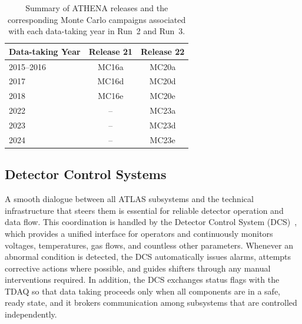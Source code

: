 \begin{table}[htbp]
    \centering
    \small
    \renewcommand{\arraystretch}{1.3} %
    \setlength{\tabcolsep}{12pt}      %
    \caption{Summary of ATHENA releases and the corresponding Monte Carlo campaigns associated with each data-taking year in Run~2 and Run~3.}
    \label{tab:athena_mc_campaigns}
    \begin{tabular}{lcc}
        \hline
        \textbf{Data-taking Year} & \textbf{Release 21} & \textbf{Release 22} \\
        \hline
        2015--2016 & MC16a & MC20a \\
        2017       & MC16d & MC20d \\
        2018       & MC16e & MC20e \\
        \hline
        2022       & --    & MC23a \\
        2023       & --    & MC23d \\
        2024       & --    & MC23e \\
        \hline
    \end{tabular}
\end{table}



\subsection{Detector Control Systems}
\label{sec:dcs}
A smooth dialogue between all ATLAS subsystems and the technical infrastructure that steers them is essential for reliable detector operation and data flow. This coordination is handled by the Detector Control System (DCS)~\cite{atlas_DCS}, which provides a unified interface for operators and continuously monitors voltages, temperatures, gas flows, and countless other parameters. Whenever an abnormal condition is detected, the DCS automatically issues alarms, attempts corrective actions where possible, and guides shifters through any manual interventions required. In addition, the DCS exchanges status flags with the TDAQ so that data taking proceeds only when all components are in a safe, ready state, and it brokers communication among subsystems that are controlled independently.

